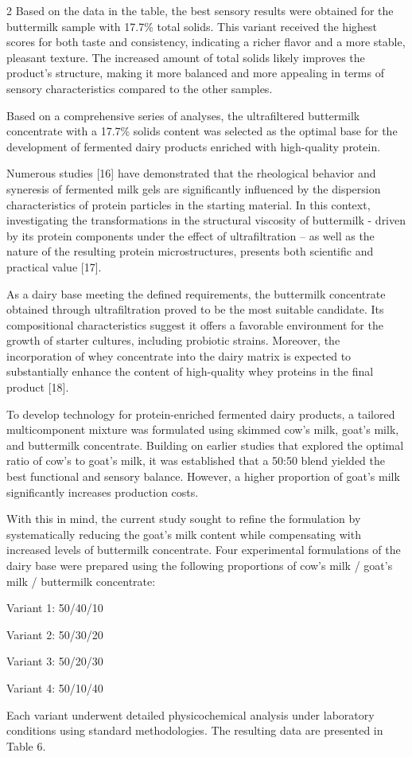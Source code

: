 \begin{multicols}{2}
Based on the data in the table, the best sensory results were obtained
for the buttermilk sample with 17.7\% total solids. This variant
received the highest scores for both taste and consistency, indicating a
richer flavor and a more stable, pleasant texture. The increased amount
of total solids likely improves the product's structure, making it more
balanced and more appealing in terms of sensory characteristics compared
to the other samples.

Based on a comprehensive series of analyses, the ultrafiltered
buttermilk concentrate with a 17.7\% solids content was selected as the
optimal base for the development of fermented dairy products enriched
with high-quality protein.

Numerous studies {[}16{]} have demonstrated that the rheological
behavior and syneresis of fermented milk gels are significantly
influenced by the dispersion characteristics of protein particles in the
starting material. In this context, investigating the transformations in
the structural viscosity of buttermilk - driven by its protein
components under the effect of ultrafiltration -- as well as the nature
of the resulting protein microstructures, presents both scientific and
practical value {[}17{]}.

As a dairy base meeting the defined requirements, the buttermilk
concentrate obtained through ultrafiltration proved to be the most
suitable candidate. Its compositional characteristics suggest it offers
a favorable environment for the growth of starter cultures, including
probiotic strains. Moreover, the incorporation of whey concentrate into
the dairy matrix is expected to substantially enhance the content of
high-quality whey proteins in the final product {[}18{]}.

To develop technology for protein-enriched fermented dairy products, a
tailored multicomponent mixture was formulated using skimmed cow's milk,
goat's milk, and buttermilk concentrate. Building on earlier studies
that explored the optimal ratio of cow's to goat's milk, it was
established that a 50:50 blend yielded the best functional and sensory
balance. However, a higher proportion of goat's milk significantly
increases production costs.

With this in mind, the current study sought to refine the formulation by
systematically reducing the goat's milk content while compensating with
increased levels of buttermilk concentrate. Four experimental
formulations of the dairy base were prepared using the following
proportions of cow's milk / goat's milk / buttermilk concentrate:

Variant 1: 50/40/10

Variant 2: 50/30/20

Variant 3: 50/20/30

Variant 4: 50/10/40

Each variant underwent detailed physicochemical analysis under
laboratory conditions using standard methodologies. The resulting data
are presented in Table 6.
\end{multicols}

